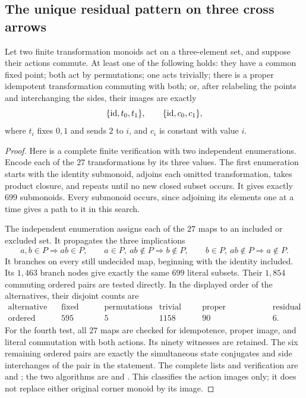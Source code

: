 \subsection{The unique residual pattern on three cross arrows}

\begin{lemma}
\label{C:three-point-commuting-images}
Let two finite transformation monoids act on a three-element set,
and suppose their actions commute.  At least one of the following
holds: they have a common fixed point; both act by permutations;
one acts trivially; there is a proper idempotent transformation
commuting with both; or, after relabeling the points and interchanging
the sides, their images are exactly
\[
 \{\mathrm {id},t_0,t_1\},\qquad \{\mathrm {id},c_0,c_1\},
\]
where $t_i$ fixes $0,1$ and sends $2$ to $i$, and $c_i$ is
constant with value $i$.
\end{lemma}
\begin{proof}
Here is a complete finite verification with two independent
enumerations.  Encode each of the $27$ transformations by its
three values.  The first enumeration starts with the identity
submonoid, adjoins each omitted transformation, takes product
closure, and repeats until no new closed subset occurs.  It gives
exactly $699$ submonoids.  Every submonoid occurs, since adjoining
its elements one at a time gives a path to it in this search.

The independent enumeration assigns each of the $27$ maps to
an included or excluded set.  It propagates the three implications
\[
 a,b\in P\Rightarrow ab\in P,\qquad
 a\in P,\ ab\notin P\Rightarrow b\notin P,\qquad
 b\in P,\ ab\notin P\Rightarrow a\notin P.
\]
It branches on every still undecided map, beginning with the
identity included.  Its $1{,}463$ branch nodes give exactly the
same $699$ literal subsets.  Their $1{,}854$ commuting ordered
pairs are tested directly.  In the displayed order of the
alternatives, their disjoint counts are
\[
\begin{array}{c|rrrrr}
\text{alternative}&\text{fixed point}&\text{permutations}&
 \text{trivial side}&\text{proper idempotent}&\text{residual}\\\hline
\text{ordered pairs}&595&5&1158&90&6.
\end{array}
\]
For the fourth test, all $27$ maps are checked for idempotence,
proper image, and literal commutation with both actions.  Its
ninety witnesses are retained.  The six remaining ordered pairs
are exactly the simultaneous state conjugates and side interchanges
of the pair in the statement.
The complete lists and verification are
 and
;
the two algorithms are
 and
.
This classifies the action images only; it does not replace either
original corner monoid by its image.
\end{proof}

